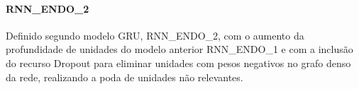              \paragraph{RNN\_ENDO\_2}
                Definido segundo modelo GRU, RNN\_ENDO\_2, com o aumento da profundidade de unidades do modelo anterior RNN\_ENDO\_1 e com a inclusão do recurso Dropout para eliminar unidades com pesos negativos no grafo denso da rede, realizando a poda de unidades não relevantes.
                \begin{figure}[H]
                \end{figure}
